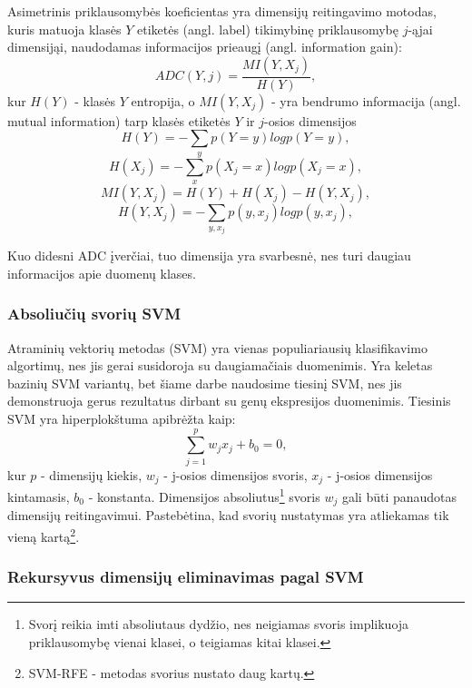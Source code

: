 Asimetrinis priklausomybės koeficientas yra dimensijų reitingavimo motodas,
kuris matuoja klasės $Y$ etiketės (angl. label) tikimybinę priklausomybę $j$-ąjai
dimensijąi, naudodamas informacijos prieaugį (angl. information gain):
\begin{equation}
 ADC(Y, j) = \frac{MI(Y, X_j)}{H(Y)},
\end{equation}
kur $H(Y)$ - klasės $Y$ entropija, o $MI(Y, X_j)$ - yra bendrumo informacija
(angl. mutual information) tarp klasės etiketės $Y$ ir $j$-osios dimensijos
\begin{equation}
 H(Y)=-\sum_y{p(Y=y)log{p(Y=y)}}, 
\end{equation}
\begin{equation}
 H(X_j)=-\sum_x{p(X_j=x) log{p(X_j=x)}},
\end{equation}
\begin{equation}
 MI(Y, X_j) = H(Y) + H(X_j) - H(Y, X_j),
\end{equation}
\begin{equation}
 H(Y, X_j) = -\sum_{y,x_j}{p(y, x_j)log{p(y, x_j)}},
\end{equation}

Kuo didesni ADC įverčiai, tuo dimensija yra svarbesnė, nes turi daugiau
informacijos apie duomenų klases.

\subsubsection{Absoliučių svorių SVM}

Atraminių vektorių metodas (SVM) yra vienas populiariausių klasifikavimo algortimų,
nes jis gerai susidoroja su daugiamačiais duomenimis. Yra keletas bazinių 
SVM variantų, bet šiame darbe naudosime tiesinį SVM, nes jis demonstruoja
gerus rezultatus dirbant su genų ekspresijos duomenimis. Tiesinis SVM yra
hiperplokštuma apibrėžta kaip:
\begin{equation}
 \sum_{j=1}^{p}{w_jx_j + b_0 = 0},
\end{equation}
kur $p$ - dimensijų kiekis, $w_j$ - j-osios dimensijos svoris, $x_j$ - j-osios
dimensijos kintamasis, $b_0$ - konstanta. Dimensijos absoliutus\footnote{Svorį
reikia imti absoliutaus dydžio, nes neigiamas svoris implikuoja priklausomybę 
vienai klasei, o teigiamas kitai klasei.} svoris $w_j$ gali būti panaudotas
dimensijų reitingavimui. Pastebėtina, kad svorių nustatymas yra atliekamas tik 
vieną kartą\footnote{SVM-RFE - metodas svorius nustato daug kartų.}.

\subsubsection{Rekursyvus dimensijų eliminavimas pagal SVM}

